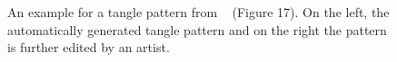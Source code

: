 \begin{figure}[H]
    \centering
    \caption{\label{fig:santoni_2016_ggp}An example for a tangle pattern from \citeauthor*{santoni_2016_ggp}~\cite{santoni_2016_ggp} (Figure 17). On the left, the automatically generated tangle pattern and on the right the pattern is further edited by an artist.}
\end{figure}

